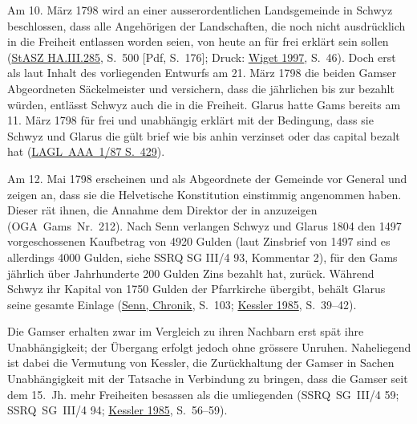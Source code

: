 \documentclass[10pt,twoside]{article}
\begin{document}
\begin{introlist}
{            Am 10. März 1798 wird an einer ausserordentlichen
               Landsgemeinde in Schwyz beschlossen, dass alle Angehörigen der Landschaften, die noch nicht
               ausdrücklich in die Freiheit entlassen worden seien, von heute an für frei erklärt sein sollen
               (\href{https://query.staatsarchiv.sz.ch/detail.aspx?ID=371412}{StASZ
                  HA.III.285}, S. 500 [Pdf, S. 176]; Druck: \href{http://permalink.snl.ch/bib/chbsg000091380}{Wiget 1997}, S. 46).
               Doch erst als laut Inhalt des vorliegenden Entwurfs am 21. März
                  1798 die beiden Gamser Abgeordneten Säckelmeister  und  versichern,
               dass die jährlichen  bis zur  bezahlt würden, entlässt Schwyz auch die  in die Freiheit. Glarus hatte Gams bereits am 11. März 1798 für frei und unabhängig erklärt mit der Bedingung, dass
               sie Schwyz und Glarus die \textup{gült brief wie bis anhin verzinset oder das capital bezalt
                  hat} (\href{https://archivverzeichnis.gl.ch/home/\#/content/22acebab9be045be9a31e1564d611365}{LAGL AAA 1/87 S. 429}).


            Am 12. Mai 1798 erscheinen  und  als Abgeordnete der Gemeinde  vor General 
               und zeigen an, dass sie die Helvetische Konstitution einstimmig angenommen haben.
               Dieser rät ihnen, die Annahme dem Direktor der  in 
               anzuzeigen (OGA Gams Nr. 212). Nach Senn verlangen Schwyz und Glarus 1804 den 1497 vorgeschossenen Kaufbetrag von 4920 Gulden (laut Zinsbrief von 1497 sind es allerdings 4000 Gulden, siehe SSRQ SG III/4 93, Kommentar 2), für den Gams jährlich
               über Jahrhunderte 200 Gulden Zins bezahlt hat, zurück. Während Schwyz ihr Kapital von
               1750 Gulden der Pfarrkirche  übergibt,
               behält Glarus seine gesamte Einlage (\href{http://permalink.snl.ch/bib/chbsg000113555}{Senn, Chronik},
                  S. 103; \href{http://permalink.snl.ch/bib/chbsg000081018}{Kessler 1985}, S. 39–42).


            Die Gamser erhalten zwar im Vergleich zu ihren Nachbarn erst spät ihre Unabhängigkeit; der
               Übergang erfolgt jedoch ohne grössere Unruhen. Naheliegend ist dabei die Vermutung von Kessler,
               die Zurückhaltung der Gamser in Sachen Unabhängigkeit mit der Tatsache in Verbindung zu
               bringen, dass die Gamser seit dem 15. Jh. mehr
               Freiheiten besassen als die umliegenden 
               (SSRQ~SG~III/4 59; SSRQ~SG~III/4 94; \href{http://permalink.snl.ch/bib/chbsg000081018}{Kessler 1985},
                  S. 56–59). 


}
\end{introlist}
\end{document}
